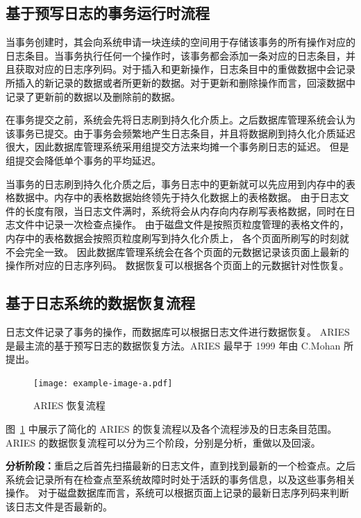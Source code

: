 \subsection{基于预写日志的事务运行时流程}

当事务创建时，其会向系统申请一块连续的空间用于存储该事务的所有操作对应的日志条目。当事务执行任何一个操作时，该事务都会添加一条对应的日志条目，并且获取对应的日志序列码。对于插入和更新操作，日志条目中的重做数据中会记录所插入的新记录的数据或者所更新的数据。对于更新和删除操作而言，回滚数据中记录了更新前的数据以及删除前的数据。

在事务提交之前，系统会先将日志刷到持久化介质上。之后数据库管理系统会认为该事务已提交。由于事务会频繁地产生日志条目，并且将数据刷到持久化介质延迟很大，因此数据库管理系统采用组提交方法来均摊一个事务刷日志的延迟。
但是组提交会降低单个事务的平均延迟。

当事务的日志刷到持久化介质之后，事务日志中的更新就可以先应用到内存中的表格数据中。内存中的表格数据始终领先于持久化数据上的表格数据。
由于日志文件的长度有限，当日志文件满时，系统将会从内存向内存刷写表格数据，同时在日志文件中记录一次检查点操作。
由于磁盘文件是按照页粒度管理的表格文件的，内存中的表格数据会按照页粒度刷写到持久化介质上，
各个页面所刷写的时刻就不会完全一致。
因此数据库管理系统会在各个页面的元数据记录该页面上最新的操作所对应的日志序列码。
数据恢复可以根据各个页面上的元数据针对性恢复。


\subsection{基于日志系统的数据恢复流程}

日志文件记录了事务的操作，而数据库可以根据日志文件进行数据恢复。
ARIES 是最主流的基于预写日志的数据恢复方法。ARIES 最早于 1999 年由 C.Mohan 所提出\cite{mohan_aries_1992}。

\begin{figure}
    \centering
    \texttt{[image: example-image-a.pdf]}
    \caption{ARIES 恢复流程}
    \label{fig:ARIES}
\end{figure}


图~\ref{fig:ARIES} 中展示了简化的 ARIES 的恢复流程以及各个流程涉及的日志条目范围。
ARIES 的数据恢复流程可以分为三个阶段，分别是分析，重做以及回滚。

\textbf{分析阶段：}重启之后首先扫描最新的日志文件，直到找到最新的一个检查点。之后系统会记录所有在检查点至系统故障时时处于活跃的事务信息，以及这些事务相关操作。
对于磁盘数据库而言，系统可以根据页面上记录的最新日志序列码来判断该日志文件是否最新的。

